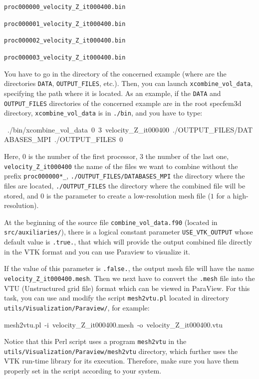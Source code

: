 \medskip

\texttt{proc000000\_velocity\_Z\_it000400.bin }

\texttt{proc000001\_velocity\_Z\_it000400.bin }

\texttt{proc000002\_velocity\_Z\_it000400.bin }

\texttt{proc000003\_velocity\_Z\_it000400.bin}

\medskip

You have to go in the directory of the concerned example (where are the directories \texttt{DATA}, \texttt{OUTPUT\_FILES}, etc.).
Then, you can launch \texttt{xcombine\_vol\_data}, specifying the path where it is located. As an example, if the \texttt{DATA} and \texttt{OUTPUT\_FILES} directories of the concerned example are in the root specfem3d directory, \texttt{xcombine\_vol\_data} is in \texttt{./bin}, and you have to type:

\begin{lyxcode}
~{\footnotesize ./bin/xcombine\_vol\_data~0~3~velocity\_Z\_it000400~./OUTPUT\_FILES/DATABASES\_MPI~./OUTPUT\_FILES~0~}{\footnotesize \par}
\end{lyxcode}

Here, $0$ is the number of the first processor, $3$ the number of the last one, \texttt{velocity\_Z\_it000400} the name of the files we want to combine without the prefix \texttt{proc000000*\_}, \texttt{./OUTPUT\_FILES/DATABASES\_MPI} the directory where the files are located, \texttt{./OUTPUT\_FILES} the directory where the combined file will be stored, and $0$ is the parameter to create a low-resolution mesh file ($1$ for a high-resolution).

\medskip

At the beginning of the source file \texttt{combine\_vol\_data.f90} (located in \texttt{src/auxiliaries/}), there is a logical constant parameter \texttt{USE\_VTK\_OUTPUT} whose default value is \texttt{.true.}, that which will provide the output combined file directly in the VTK format and you can use Paraview to visualize it.

\medskip

If the value of this parameter is \texttt{.false.}, the output mesh file will have the name \texttt{velocity\_Z\_it000400.mesh}. Then we next have to convert the
\texttt{.mesh} file into the VTU (Unstructured grid file) format which can be viewed in ParaView. For this task, you can use and modify the
script \texttt{mesh2vtu.pl} located in directory \texttt{utils/Visualization/Paraview/}, for example:
\begin{lyxcode}
{\footnotesize mesh2vtu.pl~-i~velocity\_Z\_it000400.mesh~-o~velocity\_Z\_it000400.vtu}{\footnotesize \par}
\end{lyxcode}
Notice that this Perl script uses a program \texttt{mesh2vtu} in the \texttt{utils/Visualization/Paraview/mesh2vtu} directory, which further
uses the VTK  run-time library for its execution. Therefore, make sure you have them properly set
in the script according to your system.

